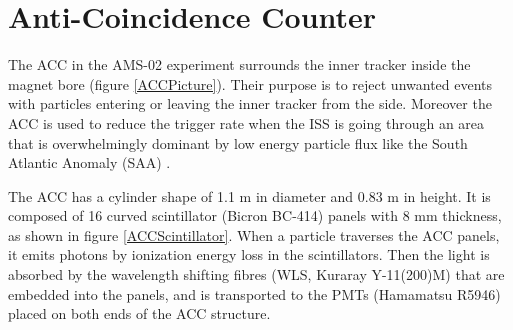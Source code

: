 
\section{Anti-Coincidence Counter}

The ACC in the AMS-02 experiment surrounds the inner tracker inside the magnet bore \cite{ACCPaper1, ACCPaper2} (figure \ref{ACCPicture}). Their purpose is to reject unwanted events with particles entering or leaving the inner tracker from the side. Moreover the ACC is used to reduce the trigger rate when the ISS is going through an area that is overwhelmingly dominant by low energy particle flux like the South Atlantic Anomaly (SAA) \cite{ACCAsTrigger}.  \par 

The ACC has a cylinder shape of 1.1 m in diameter and 0.83 m in height. It is composed of 16 curved scintillator (Bicron BC-414) panels with 8 mm thickness, as shown in figure \ref{ACCScintillator}. When a particle traverses the ACC panels, it emits photons by ionization energy loss in the scintillators. Then the light is absorbed by the wavelength shifting fibres (WLS, Kuraray Y-11(200)M) that are embedded into the panels, and is transported to the PMTs (Hamamatsu R5946) placed on both ends of the ACC structure.  \par

